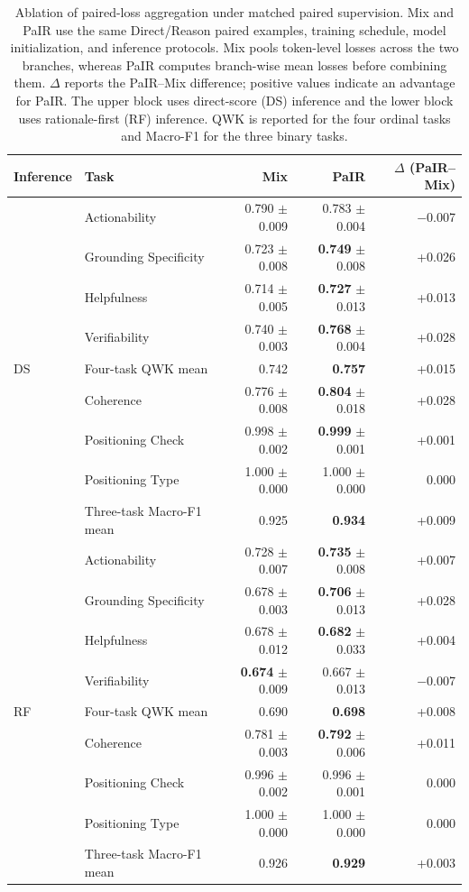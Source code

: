 \begin{table}[t]
\centering
\small
\setlength{\tabcolsep}{3.5pt}
\begin{tabular}{llrrr}
\toprule
Inference & Task & Mix & PaIR & $\Delta$ (PaIR--Mix) \\
\midrule
\multirow{9}{*}{DS}
& Actionability
& 0.790 $\pm$ 0.009
& 0.783 $\pm$ 0.004
& $-$0.007 \\
& Grounding Specificity
& 0.723 $\pm$ 0.008
& \textbf{0.749} $\pm$ 0.008
& +0.026 \\
& Helpfulness
& 0.714 $\pm$ 0.005
& \textbf{0.727} $\pm$ 0.013
& +0.013 \\
& Verifiability
& 0.740 $\pm$ 0.003
& \textbf{0.768} $\pm$ 0.004
& +0.028 \\
\cmidrule(lr){2-5}
& Four-task QWK mean
& 0.742
& \textbf{0.757}
& +0.015 \\
\cmidrule(lr){2-5}
& Coherence
& 0.776 $\pm$ 0.008
& \textbf{0.804} $\pm$ 0.018
& +0.028 \\
& Positioning Check
& 0.998 $\pm$ 0.002
& \textbf{0.999} $\pm$ 0.001
& +0.001 \\
& Positioning Type
& 1.000 $\pm$ 0.000
& 1.000 $\pm$ 0.000
& 0.000 \\
\cmidrule(lr){2-5}
& Three-task Macro-F1 mean
& 0.925
& \textbf{0.934}
& +0.009 \\
\midrule
\multirow{9}{*}{RF}
& Actionability
& 0.728 $\pm$ 0.007
& \textbf{0.735} $\pm$ 0.008
& +0.007 \\
& Grounding Specificity
& 0.678 $\pm$ 0.003
& \textbf{0.706} $\pm$ 0.013
& +0.028 \\
& Helpfulness
& 0.678 $\pm$ 0.012
& \textbf{0.682} $\pm$ 0.033
& +0.004 \\
& Verifiability
& \textbf{0.674} $\pm$ 0.009
& 0.667 $\pm$ 0.013
& $-$0.007 \\
\cmidrule(lr){2-5}
& Four-task QWK mean
& 0.690
& \textbf{0.698}
& +0.008 \\
\cmidrule(lr){2-5}
& Coherence
& 0.781 $\pm$ 0.003
& \textbf{0.792} $\pm$ 0.006
& +0.011 \\
& Positioning Check
& 0.996 $\pm$ 0.002
& 0.996 $\pm$ 0.001
& 0.000 \\
& Positioning Type
& 1.000 $\pm$ 0.000
& 1.000 $\pm$ 0.000
& 0.000 \\
\cmidrule(lr){2-5}
& Three-task Macro-F1 mean
& 0.926
& \textbf{0.929}
& +0.003 \\
\bottomrule
\end{tabular}
\caption{Ablation of paired-loss aggregation under matched paired supervision.
Mix and PaIR use the same Direct/Reason paired examples, training schedule,
model initialization, and inference protocols. Mix pools token-level losses
across the two branches, whereas PaIR computes branch-wise mean losses before
combining them. $\Delta$ reports the PaIR--Mix difference; positive values
indicate an advantage for PaIR. The upper block uses direct-score (DS)
inference and the lower block uses rationale-first (RF) inference. QWK is
reported for the four ordinal tasks and Macro-F1 for the three binary tasks.
}
\label{tab:pair-mix-ablation}
\end{table}